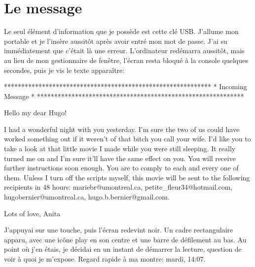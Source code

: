 \chapter{Le message}
Le seul élément d'information que je possède est cette clé
USB. J'allume mon portable et je l'insère aussitôt après avoir entré
mon mot de passe. J'ai su immédiatement que c'était là une
erreur. L'ordinateur redémarra aussitôt, mais au lieu de mon
gestionnaire de fenêtre, l'écran resta bloqué à la console quelques
secondes, puis je vis le texte apparaître:

************************************************************
*                       Incoming Message                   *
************************************************************

Hello my dear Hugo!

I had a wonderful night with you yesterday. I'm sure the two of us
could have worked something out if it weren't of that bitch you call
your wife. I'd like you to take a look at that little movie I made
while you were still sleeping. It really turned me on and I'm sure
it'll have the same effect on you. You will receive further
instructions soon enough. You are to comply to each and every one of
them. Unless I turn off the scripts myself, this movie will be sent to
the following recipients in 48 hours: mariebr@umontreal.ca,
petite_fleur34@hotmail.com, hugobernier@umontreal.ca,
hugo.b.bernier@gmail.com.

Lots of love,
Anita

J'appuyai sur une touche, puis l'écran redevint noir. Un cadre
rectangulaire apparu, avec une icône play en son centre et une barre
de défilement au bas. Au point où j'en étais, je décidai en un instant
de démarrer la lecture, question de voir à quoi je m'expose. Regard
rapide à ma montre: mardi, 14:07.
